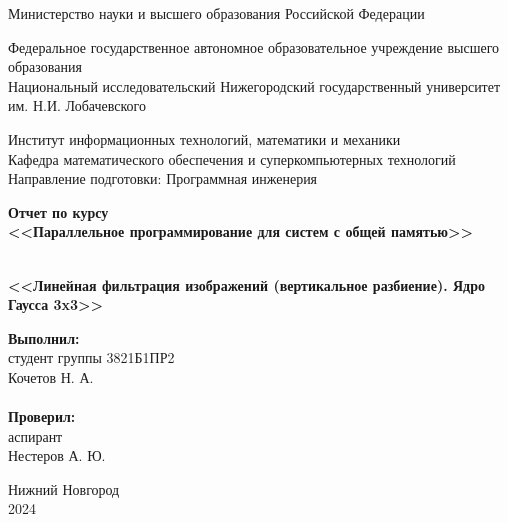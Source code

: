 \documentclass{report}
\begin{document}
\begin{titlepage}

\begin{center}
Министерство науки и высшего образования Российской Федерации
\end{center}

\begin{center}
Федеральное государственное автономное образовательное учреждение высшего образования \\
Национальный исследовательский Нижегородский государственный университет \newline им. Н.И. Лобачевского
\end{center}

\begin{center}
Институт информационных технологий, математики и механики \\
Кафедра математического обеспечения и суперкомпьютерных технологий \\
Направление подготовки: Программная инженерия
\end{center}

\begin{center}
\textbf{Отчет по курсу \\
\vspace{0.5em}
<<Параллельное программирование для систем с общей памятью>>} \\
\end{center}

\vspace{4em}

\begin{center}
\textbf{ \\
\vspace{0.5em}
<<Линейная фильтрация изображений (вертикальное разбиение). Ядро Гаусса 3x3>>} \\
\end{center}

\vspace{4em}

\newbox{\lbox}
\newlength{\maxl}
\setlength{\maxl}{\wd\lbox}
\hfill\parbox{7cm}{
\hspace*{5cm}\hspace*{-5cm}\textbf{Выполнил:} \\ студент группы 3821Б1ПР2\\Кочетов Н. А.\\
\\
\hspace*{5cm}\hspace*{-5cm}\textbf{Проверил:}\\ аспирант\\Нестеров А. Ю.\\
}
\vspace{\fill}

\begin{center} Нижний Новгород \\ 2024 \end{center}

\end{titlepage}
\end{document}
